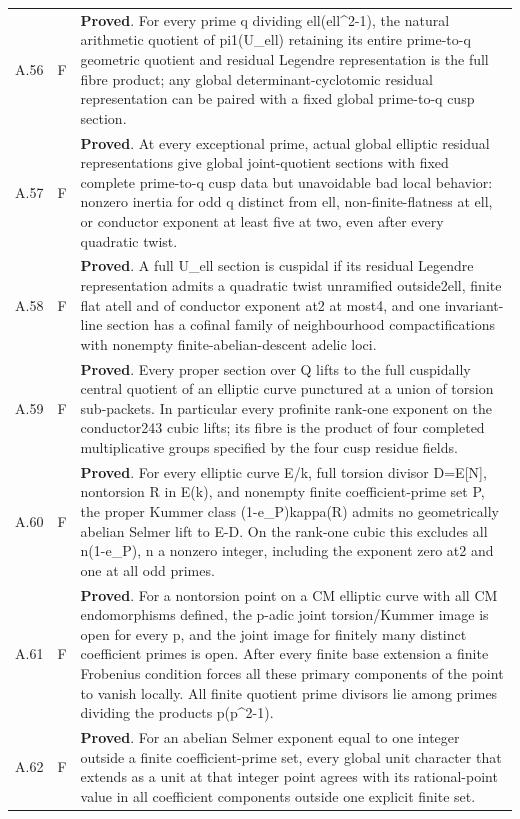 \begin{longtable}{@{}p{}p{}p{}@{}}
A.56 & F & \textbf{Proved}. For every prime q dividing ell(ell\textasciicircum{}2-1), the natural arithmetic quotient of pi1(U\_ell) retaining its entire prime-to-q geometric quotient and residual Legendre representation is the full fibre product; any global determinant-cyclotomic residual representation can be paired with a fixed global prime-to-q cusp section. \\
A.57 & F & \textbf{Proved}. At every exceptional prime, actual global elliptic residual representations give global joint-quotient sections with fixed complete prime-to-q cusp data but unavoidable bad local behavior: nonzero inertia for odd q distinct from ell, non-finite-flatness at ell, or conductor exponent at least five at two, even after every quadratic twist. \\
A.58 & F & \textbf{Proved}. A full U\_ell section is cuspidal if its residual Legendre representation admits a quadratic twist unramified outside2ell, finite flat atell and of conductor exponent at2 at most4, and one invariant-line section has a cofinal family of neighbourhood compactifications with nonempty finite-abelian-descent adelic loci. \\
A.59 & F & \textbf{Proved}. Every proper section over Q lifts to the full cuspidally central quotient of an elliptic curve punctured at a union of torsion sub-packets. In particular every profinite rank-one exponent on the conductor243 cubic lifts; its fibre is the product of four completed multiplicative groups specified by the four cusp residue fields. \\
A.60 & F & \textbf{Proved}. For every elliptic curve E/k, full torsion divisor D=E[N], nontorsion R in E(k), and nonempty finite coefficient-prime set P, the proper Kummer class (1-e\_P)kappa(R) admits no geometrically abelian Selmer lift to E-D. On the rank-one cubic this excludes all n(1-e\_P), n a nonzero integer, including the exponent zero at2 and one at all odd primes. \\
A.61 & F & \textbf{Proved}. For a nontorsion point on a CM elliptic curve with all CM endomorphisms defined, the p-adic joint torsion/Kummer image is open for every p, and the joint image for finitely many distinct coefficient primes is open. After every finite base extension a finite Frobenius condition forces all these primary components of the point to vanish locally. All finite quotient prime divisors lie among primes dividing the products p(p\textasciicircum{}2-1). \\
A.62 & F & \textbf{Proved}. For an abelian Selmer exponent equal to one integer outside a finite coefficient-prime set, every global unit character that extends as a unit at that integer point agrees with its rational-point value in all coefficient components outside one explicit finite set. \\

\end{longtable}
